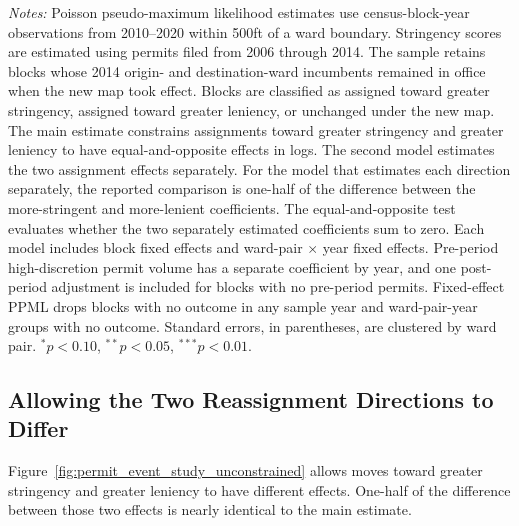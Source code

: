 \begin{table}[htbp]
    \centering
    \caption{Permit Effects with Combined and Separate Reassignment Directions}
    \label{tab:permit_event_study_did}
    

    \footnotesize
    \textit{Notes:} Poisson pseudo-maximum likelihood estimates use census-block-year observations from 2010--2020 within 500ft of a ward boundary.
    Stringency scores are estimated using permits filed from 2006 through 2014.
    The sample retains blocks whose 2014 origin- and destination-ward incumbents remained in office when the new map took effect.
    Blocks are classified as assigned toward greater stringency, assigned toward greater leniency, or unchanged under the new map.
    The main estimate constrains assignments toward greater stringency and greater leniency to have equal-and-opposite effects in logs.
    The second model estimates the two assignment effects separately.
    For the model that estimates each direction separately, the reported comparison is one-half of the difference between the more-stringent and more-lenient coefficients.
    The equal-and-opposite test evaluates whether the two separately estimated coefficients sum to zero.
    Each model includes block fixed effects and ward-pair $\times$ year fixed effects.
    Pre-period high-discretion permit volume has a separate coefficient by year, and one post-period adjustment is included for blocks with no pre-period permits.
    Fixed-effect PPML drops blocks with no outcome in any sample year and ward-pair-year groups with no outcome.
    Standard errors, in parentheses, are clustered by ward pair.
    $^{*}p<0.10$, $^{**}p<0.05$, $^{***}p<0.01$.
\end{table}

\subsection{Allowing the Two Reassignment Directions to Differ}
\label{sec:appendix_permit_unconstrained}

Figure~\ref{fig:permit_event_study_unconstrained} allows moves toward greater stringency and greater leniency to have different effects.
One-half of the difference between those two effects is nearly identical to the main estimate.

